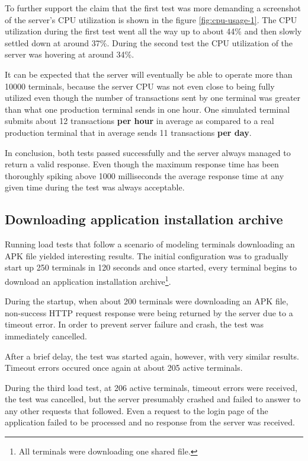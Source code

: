 \documentclass[12pt, a4paper]{article}
\begin{document}
To further support the claim that the first test was more demanding a screenshot of the server's CPU utilization is shown in the figure \ref{fig:cpu-usage-1}.
The CPU utilization during the first test went all the way up to about 44\% and then slowly settled down at around 37\%.
During the second test the CPU utilization of the server was hovering at around 34\%.

It can be expected that the server will eventually be able to operate more than 10000 terminals, because the server CPU was not even close to being fully utilized even though the number of transactions sent by one terminal was greater than what one production terminal sends in one hour.
One simulated terminal submits about 12 transactions \textbf{per hour} in average as compared to a real production terminal that in average sends 11 transactions \textbf{per day}.

In conclusion, both tests passed successfully and the server always managed to return a valid response.
Even though the maximum response time has been thoroughly spiking above 1000 milliseconds the average response time at any given time during the test was always acceptable.


\subsection{Downloading application installation archive}

Running load tests that follow a scenario of modeling terminals downloading an APK file yielded interesting results.
The initial configuration was to gradually start up 250 terminals in 120 seconds and once started, every terminal begins to download an application installation archive\footnote{All terminals were downloading one shared file.}.

During the startup, when about 200 terminals were downloading an APK file, non-success HTTP request response were being returned by the server due to a timeout error.
In order to prevent server failure and crash, the test was immediately cancelled.

After a brief delay, the test was started again, however, with very similar results.
Timeout errors occured once again at about 205 active terminals.

During the third load test, at 206 active terminals, timeout errors were received, the test was cancelled, but the server presumably crashed and failed to answer to any other requests that followed.
Even a request to the login page of the application failed to be processed and no response from the server was received. 
\end{document}
